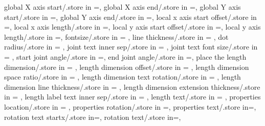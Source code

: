 {  global X axis start/.store in =\globalXstart,
  global X axis end/.store in =\globalXend,
  global Y axis start/.store in =\globalYstart,
  global Y axis end/.store in =\globalYend,
  local x axis start offset/.store in =\localxstartoffset,
  local x axis length/.store in =\localxlength,
  local y axis start offset/.store in =\localystartoffset,
  local y axis length/.store in =\localylength,
  fontsize/.store in = \ffsize,
  line thickness/.store in = \linethickness,
  dot radius/.store in = \dotradius,
  joint text inner sep/.store in = \jointinnersep,
  joint text font size/.store in = \jointtextfontsize,
  start joint angle/.store in =\startjointangle,
  end joint angle/.store in =\endjointangle,
  place the length dimension/.store in = \placelengthdim,
  length dimension offset/.store in = \lengthdimoffset,
  length dimension space ratio/.store in = \lengthdimspaceratio,
  length dimension text rotation/.store in = \lengthlabelrotation,
  length dimension line thickness/.store in = \lengthdimlinethick,
  length dimension extension thickness/.store in = \lengthdimextthick,
  length label text inner sep/.store in = \lengthlabeltextinnersep,
  length text/.store in = \lengthtext,
  properties location/.store in = \propertyloc,
  properties rotation/.store in =\propertyrotation,
  properties text/.store in=\propertiestext,
  rotation text startx/.store in=\rotationanglex,
  rotation text/.store in=\rotationtext,}


